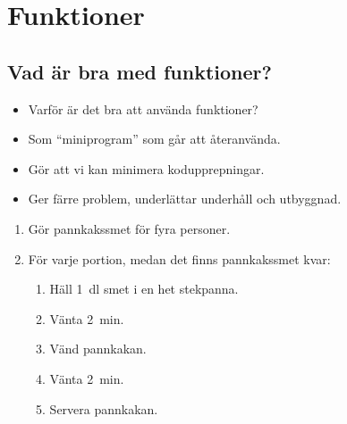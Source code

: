 \mode*

\section{Funktioner}

\subsection{Vad är bra med funktioner?}

\begin{frame}[fragile]
  \begin{exercise}
    \begin{itemize}
      \item Varför är det bra att använda funktioner?
    \end{itemize}
  \end{exercise}
\end{frame}

\begin{frame}[fragile]
  \begin{solution}
    \begin{itemize}
      \item Som \enquote{miniprogram} som går att återanvända.
      \item Gör att vi kan minimera kodupprepningar.
      \item Ger färre problem, underlättar underhåll och utbyggnad.
    \end{itemize}
  \end{solution}

  \pause

  \begin{example}
    \begin{enumerate}
    \item \alert<2>{Gör pannkakssmet} för fyra personer.
      \item För varje portion, medan det finns pannkakssmet kvar:
        \begin{enumerate}
          \item Häll \SI{1}{\deci\litre} smet i en het stekpanna.
          \item Vänta \SI{2}{\minute}.
          \item \alert<3>{Vänd} pannkakan.
          \item Vänta \SI{2}{\minute}.
          \item Servera pannkakan.
        \end{enumerate}
    \end{enumerate}
  \end{example}
\end{frame}

